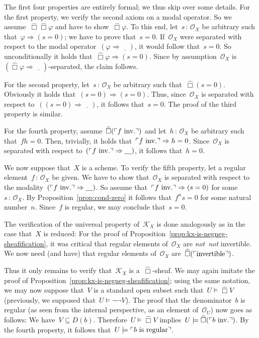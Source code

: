 \documentclass[10pt,reqno,a4paper]{amsbook}
\makeatletter
\theoremstyle{definition}
\theoremstyle{plain}
\theoremstyle{remark}
\renewcommand{\O}{\mathcal{O}}
\newcommand{\K}{\mathcal{K}}
\newcommand{\placeholder}{\underline{\quad}}
\newcommand{\?}{\,{:}\,}
\renewcommand{\_}{\mathpunct{.}\,}
\newcommand{\speak}[1]{\ulcorner\text{\textnormal{#1}}\urcorner}
\newcommand{\sdense}{{\widehat\Box}}
\newcommand{\inv}{inv.\@}
\newcommand{\notnot}{\emph{not~not}\xspace}
\renewenvironment{proof}[1][\proofname]{\par
  \pushQED{\qed}%
  \normalfont \topsep6\p@\@plus6\p@\relax
  \trivlist
  \item[\hskip\labelsep
        \itshape
    #1\@addpunct{.}]\ignorespaces
}{%
  \popQED\endtrivlist\@endpefalse
}
\makeatother
\begin{document}
\begin{proof}The first four properties are entirely formal; we thus skip over
some details. For the first property, we verify the second axiom on a modal
operator. So we assume~$\sdense\sdense\varphi$ and have to show~$\sdense\varphi$. To
this end, let~$s\?\O_X$ be arbitrary such that~$\varphi \Rightarrow (s=0)$; we
have to prove that~$s = 0$. If~$\O_X$ were separated with respect to the modal
operator~$(\varphi \Rightarrow \placeholder)$, it would follow that~$s = 0$. So
unconditionally it holds that~$\sdense\varphi \Rightarrow (s=0)$. Since by
assumption~$\O_X$ is~$(\sdense\varphi \Rightarrow \placeholder)$-separated, the claim follows.

For the second property, let~$s\?\O_X$ be arbitrary such that~$\sdense(s = 0)$.
Obviously it holds that~$(s = 0) \Rightarrow (s = 0)$. Thus, since~$\O_X$ is
separated with respect to~$((s = 0) \Rightarrow \placeholder)$, it follows
that~$s = 0$. The proof of the third property is similar.

For the fourth property, assume~$\sdense(\speak{$f$ \inv})$ and let~$h\?\O_X$ be
arbitrary such that~$fh = 0$. Then, trivially, it holds that~$\speak{$f$ \inv}
\Rightarrow h = 0$. Since~$\O_X$ is separated with respect to~$(\speak{$f$
\inv} \Rightarrow \placeholder)$, it follows that~$h = 0$.

We now suppose that~$X$ is a scheme. To verify the fifth property, let a
regular element~$f\?\O_X$ be given. We have to show that~$\O_X$ is separated
with respect to the modality~$(\speak{$f$ \inv} \Rightarrow \placeholder)$. So
assume that~$\speak{$f$ \inv} \Rightarrow (s = 0)$ for some~$s\?\O_X$. By
Proposition~\ref{prop:cond-zero} it follows that~$f^n s = 0$ for some natural
number~$n$. Since~$f$ is regular, we may conclude that~$s = 0$.

The verification of the universal property of~$\K_X$ is done analogously as in
the case that~$X$ is reduced: For the proof of
Proposition~\ref{prop:kx-is-negneg-sheafification}, it was critical that
regular elements of~$\O_X$ are \notnot invertible. We now need (and have) that
regular elements of~$\O_X$ are~$\sdense(\speak{invertible})$.

Thus it only remains to verify that~$\K_X$ is a~$\sdense$-sheaf. We may again imitate
the proof of Proposition~\ref{prop:kx-is-negneg-sheafification}; using the same
notation, we may now suppose that~$V$ is a standard open subset such that~$U \models \sdense
V$ (previously, we supposed that~$U \models \neg\neg V$). The proof that the
denominator~$b$ is regular (as seen from the internal perspective, as an
element of~$\O_U$) now goes as follows: We have~$V \subseteq
D(b)$. Therefore~$U \models \sdense V$ implies~$U \models \sdense(\speak{$b$ \inv})$. By
the fourth property, it follows that~$U \models \speak{$b$ is regular}$.
\end{proof}
\end{document}
